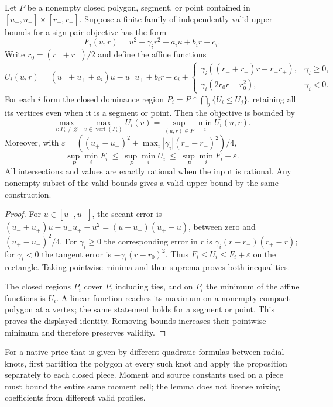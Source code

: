 \begin{proposition}
\label{prop:new-hybrid-affine-source-envelope}
Let $P$ be a nonempty closed polygon, segment, or point contained in
$[u_-,u_+]\times[r_-,r_+]$.  Suppose a finite family of independently
valid upper bounds for a sign-pair objective has the form
\[
 F_i(u,r)=u^2+\gamma_i r^2+a_i u+b_i r+c_i.
\]
Write $r_0=(r_-+r_+)/2$ and define the affine functions
\[
 U_i(u,r)=(u_-+u_++a_i)u-u_-u_++b_i r+c_i+
 \begin{cases}
  \gamma_i((r_-+r_+)r-r_-r_+),&\gamma_i\geq0,\\
  \gamma_i(2r_0r-r_0^2),&\gamma_i<0.
 \end{cases}
\]
For each $i$ form the closed dominance region
$P_i=P\cap\bigcap_j\{U_i\leq U_j\}$, retaining all its vertices even
when it is a segment or point.  Then the objective is bounded by
\[
 \max_{i:P_i\ne\varnothing}\ \max_{v\in\operatorname{vert}(P_i)}U_i(v)
       =\sup_{(u,r)\in P}\min_i U_i(u,r).
\]
Moreover, with
$\varepsilon=((u_+-u_-)^2+\max_i|\gamma_i|(r_+-r_-)^2)/4$,
\[
 \sup_P\min_iF_i\ \leq\ \sup_P\min_iU_i
                          \ \leq\ \sup_P\min_iF_i+\varepsilon.
\]
All intersections and values are exactly rational when the input is
rational.  Any nonempty subset of the valid bounds gives a valid
upper bound by the same construction.
\end{proposition}
\begin{proof}
For $u\in[u_-,u_+]$, the secant error is
$(u_-+u_+)u-u_-u_+-u^2=(u-u_-)(u_+-u)$, between zero and
$(u_+-u_-)^2/4$.  For $\gamma_i\geq0$ the corresponding error in
$r$ is $\gamma_i(r-r_-)(r_+-r)$; for $\gamma_i<0$ the tangent error
is $-\gamma_i(r-r_0)^2$.  Thus $F_i\leq U_i\leq F_i+\varepsilon$
on the rectangle.  Taking pointwise minima and then suprema proves
both inequalities.

The closed regions $P_i$ cover $P$, including ties, and on $P_i$ the
minimum of the affine functions is $U_i$.  A linear function reaches
its maximum on a nonempty compact polygon at a vertex; the same
statement holds for a segment or point.  This proves the displayed
identity.  Removing bounds increases their pointwise minimum and
therefore preserves validity.
\end{proof}

For a native price that is given by different quadratic formulas
between radial knots, first partition the polygon at every such
knot and apply the proposition separately to each closed piece.
Moment and source constants used on a piece must bound the entire
same moment cell; the lemma does not license mixing coefficients
from different valid profiles.
